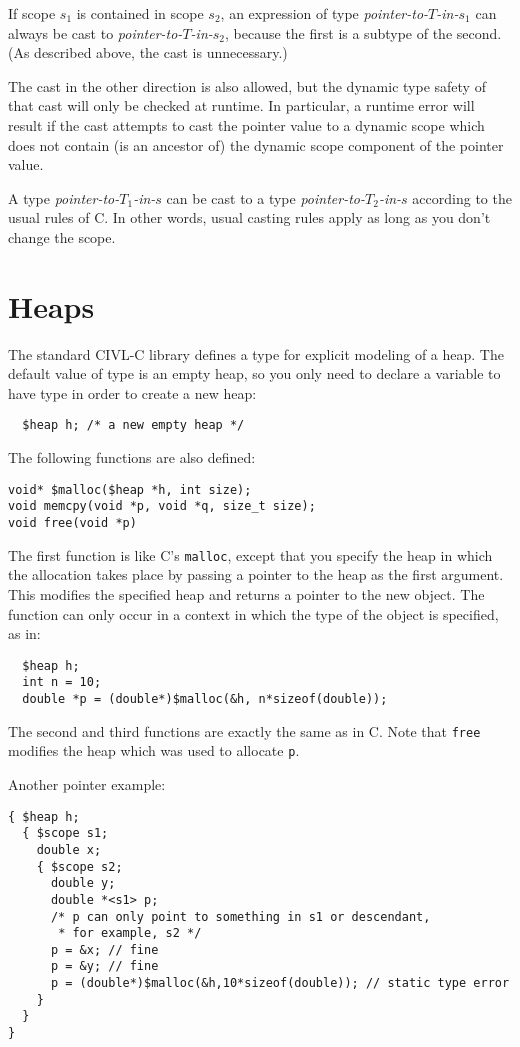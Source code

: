 If scope $s_1$ is contained in scope $s_2$, an expression of type
\emph{pointer-to-$T$-in-$s_1$} can always be cast to
\emph{pointer-to-$T$-in-$s_2$},
 because the first is a subtype of the second.  (As described above,
the cast is unnecessary.)  

The cast in the other direction is also allowed, but the dynamic type
safety of that cast will only be checked at runtime.  In particular, a
runtime error will result if the cast attempts to cast the pointer
value to a dynamic scope which does not contain (is an ancestor of)
the dynamic scope component of the pointer value.

A type \emph{pointer-to-$T_1$-in-$s$} can be cast to a type
\emph{pointer-to-$T_2$-in-$s$} according to the usual rules of C.  In
other words, usual casting rules apply as long as you don't change the
scope.



\section{Heaps}

The standard CIVL-C library defines a type \cheap{} for explicit
modeling of a heap.  The default value of \cheap{} type is an empty
heap, so you only need to declare a variable to have type \cheap{}
in order to create a new heap:
\begin{verbatim}
  $heap h; /* a new empty heap */
\end{verbatim}

The following functions are also defined:
\begin{verbatim}
void* $malloc($heap *h, int size);
void memcpy(void *p, void *q, size_t size);
void free(void *p)
\end{verbatim}
The first function is like C's \texttt{malloc}, except that you
specify the heap in which the allocation takes place by passing a
pointer to the heap as the first argument.  This modifies the
specified heap and returns a pointer to the new object.  The function
can only occur in a context in which the type of the object is
specified, as in:
\begin{verbatim}
  $heap h;
  int n = 10;
  double *p = (double*)$malloc(&h, n*sizeof(double));
\end{verbatim}
The second and third functions are exactly the same as in C. Note that
\texttt{free} modifies the heap which was used to allocate \texttt{p}.

Another pointer example:
\begin{small}
\begin{verbatim}
{ $heap h;
  { $scope s1;
    double x;
    { $scope s2;
      double y;
      double *<s1> p;
      /* p can only point to something in s1 or descendant,
       * for example, s2 */
      p = &x; // fine
      p = &y; // fine
      p = (double*)$malloc(&h,10*sizeof(double)); // static type error
    }
  }
}
\end{verbatim}
\end{small}

